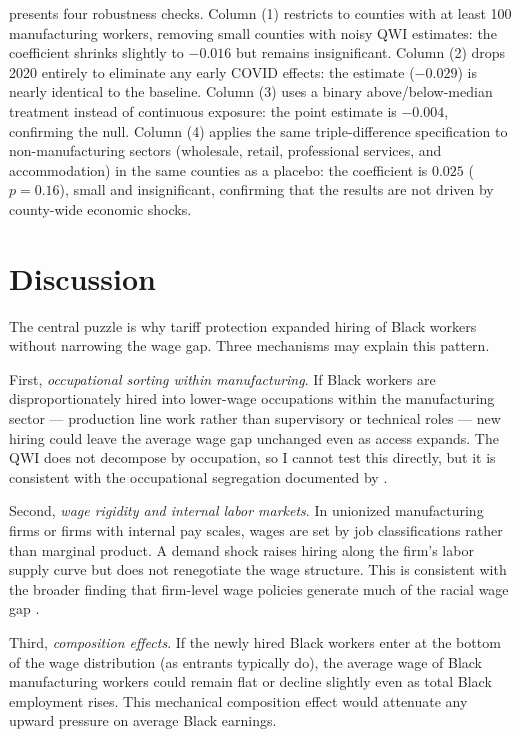 \documentclass[12pt]{article}
\begin{document}
 presents four robustness checks. Column (1) restricts to counties with at least 100 manufacturing workers, removing small counties with noisy QWI estimates: the coefficient shrinks slightly to $-0.016$ but remains insignificant. Column (2) drops 2020 entirely to eliminate any early COVID effects: the estimate ($-0.029$) is nearly identical to the baseline. Column (3) uses a binary above/below-median treatment instead of continuous exposure: the point estimate is $-0.004$, confirming the null. Column (4) applies the same triple-difference specification to non-manufacturing sectors (wholesale, retail, professional services, and accommodation) in the same counties as a placebo: the coefficient is $0.025$ ($p = 0.16$), small and insignificant, confirming that the results are not driven by county-wide economic shocks.


\section{Discussion}

The central puzzle is why tariff protection expanded hiring of Black workers without narrowing the wage gap. Three mechanisms may explain this pattern.

First, \textit{occupational sorting within manufacturing}. If Black workers are disproportionately hired into lower-wage occupations within the manufacturing sector --- production line work rather than supervisory or technical roles --- new hiring could leave the average wage gap unchanged even as access expands. The QWI does not decompose by occupation, so I cannot test this directly, but it is consistent with the occupational segregation documented by \citet{tomaskovic2006race}.

Second, \textit{wage rigidity and internal labor markets}. In unionized manufacturing firms or firms with internal pay scales, wages are set by job classifications rather than marginal product. A demand shock raises hiring along the firm's labor supply curve but does not renegotiate the wage structure. This is consistent with the broader finding that firm-level wage policies generate much of the racial wage gap \citep{card2016bargaining}.

Third, \textit{composition effects}. If the newly hired Black workers enter at the bottom of the wage distribution (as entrants typically do), the average wage of Black manufacturing workers could remain flat or decline slightly even as total Black employment rises. This mechanical composition effect would attenuate any upward pressure on average Black earnings.
\end{document}
